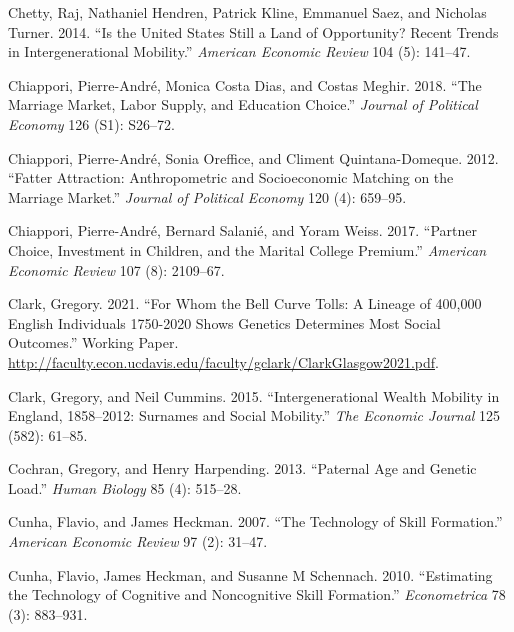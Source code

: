\documentclass[
]{article}
\newlength{\cslhangindent}
\newlength{\cslentryspacingunit} %
\newenvironment{CSLReferences}[2] %
 {%
  \setlength{\parindent}{0pt}
  \ifodd #1
  \let\oldpar\par
  \def\par{\hangindent=\cslhangindent\oldpar}
  \fi
  \setlength{\parskip}{#2\cslentryspacingunit}
 }%
 {}
\theoremstyle{definition}
\theoremstyle{definition}
\theoremstyle{definition}
\theoremstyle{definition}
\theoremstyle{remark}
\begin{document}
\begin{CSLReferences}{1}{0}
\leavevmode{}%
Chetty, Raj, Nathaniel Hendren, Patrick Kline, Emmanuel Saez, and Nicholas Turner. 2014. {``Is the United States Still a Land of Opportunity? Recent Trends in Intergenerational Mobility.''} \emph{American Economic Review} 104 (5): 141--47.

\leavevmode{}%
Chiappori, Pierre-André, Monica Costa Dias, and Costas Meghir. 2018. {``The Marriage Market, Labor Supply, and Education Choice.''} \emph{Journal of Political Economy} 126 (S1): S26--72.

\leavevmode{}%
Chiappori, Pierre-André, Sonia Oreffice, and Climent Quintana-Domeque. 2012. {``Fatter Attraction: Anthropometric and Socioeconomic Matching on the Marriage Market.''} \emph{Journal of Political Economy} 120 (4): 659--95.

\leavevmode{}%
Chiappori, Pierre-André, Bernard Salanié, and Yoram Weiss. 2017. {``Partner Choice, Investment in Children, and the Marital College Premium.''} \emph{American Economic Review} 107 (8): 2109--67.

\leavevmode{}%
Clark, Gregory. 2021. {``For Whom the Bell Curve Tolls: A Lineage of 400,000 English Individuals 1750-2020 Shows Genetics Determines Most Social Outcomes.''} Working Paper. \url{http://faculty.econ.ucdavis.edu/faculty/gclark/ClarkGlasgow2021.pdf}.

\leavevmode{}%
Clark, Gregory, and Neil Cummins. 2015. {``Intergenerational Wealth Mobility in England, 1858--2012: Surnames and Social Mobility.''} \emph{The Economic Journal} 125 (582): 61--85.

\leavevmode{}%
Cochran, Gregory, and Henry Harpending. 2013. {``Paternal Age and Genetic Load.''} \emph{Human Biology} 85 (4): 515--28.

\leavevmode{}%
Cunha, Flavio, and James Heckman. 2007. {``The Technology of Skill Formation.''} \emph{American Economic Review} 97 (2): 31--47.

\leavevmode{}%
Cunha, Flavio, James Heckman, and Susanne M Schennach. 2010. {``Estimating the Technology of Cognitive and Noncognitive Skill Formation.''} \emph{Econometrica} 78 (3): 883--931.


\end{CSLReferences}
\end{document}
